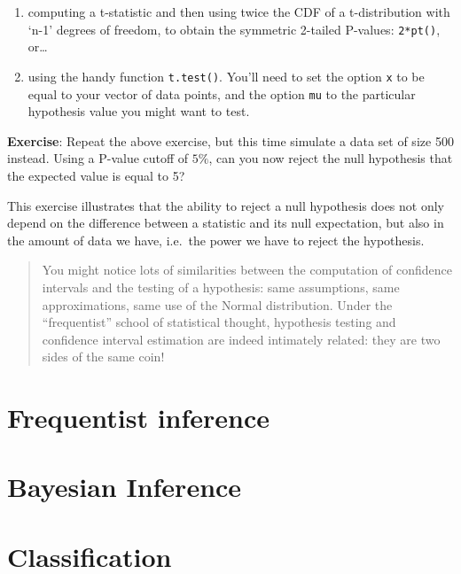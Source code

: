 \documentclass[
]{book}
\begin{document}
\begin{enumerate}
\def\labelenumi{\arabic{enumi}.}
\item
  computing a t-statistic and then using twice the CDF of a t-distribution with `n-1' degrees of freedom, to obtain the symmetric 2-tailed P-values: \texttt{2*pt()}, or\ldots{}
\item
  using the handy function \texttt{t.test()}. You'll need to set the option \texttt{x} to be equal to your vector of data points, and the option \texttt{mu} to the particular hypothesis value you might want to test.
\end{enumerate}

\textbf{Exercise}: Repeat the above exercise, but this time simulate a data set of size 500 instead. Using a P-value cutoff of \(5\%\), can you now reject the null hypothesis that the expected value is equal to 5?

This exercise illustrates that the ability to reject a null hypothesis does not only depend on the difference between a statistic and its null expectation, but also in the amount of data we have, i.e.~the power we have to reject the hypothesis.

\begin{quote}
You might notice lots of similarities between the computation of confidence intervals and the testing of a hypothesis: same assumptions, same approximations, same use of the Normal distribution. Under the ``frequentist'' school of statistical thought, hypothesis testing and confidence interval estimation are indeed intimately related: they are two sides of the same coin!
\end{quote}

\hypertarget{frequentist-inference}{%
\chapter{Frequentist inference}\label{frequentist-inference}}

\hypertarget{bayesian-inference}{%
\chapter{Bayesian Inference}\label{bayesian-inference}}

\hypertarget{classification}{%
\chapter{Classification}\label{classification}}
\end{document}
